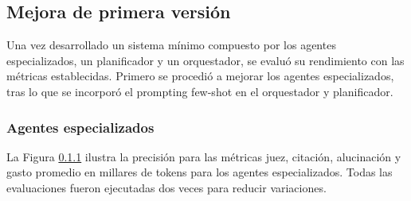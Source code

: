 \subsection{Mejora de primera versión}
Una vez desarrollado un sistema mínimo compuesto por los agentes especializados, un planificador y un orquestador, se evaluó su rendimiento con las métricas establecidas. Primero se procedió a mejorar los agentes especializados, tras lo que se incorporó el prompting few-shot en el orquestador y planificador.

\subsubsection{Agentes especializados}
La Figura \ref{} ilustra la precisión para las métricas juez, citación, alucinación y gasto promedio en millares de tokens para los agentes especializados. Todas las evaluaciones fueron ejecutadas dos veces para reducir variaciones. 

